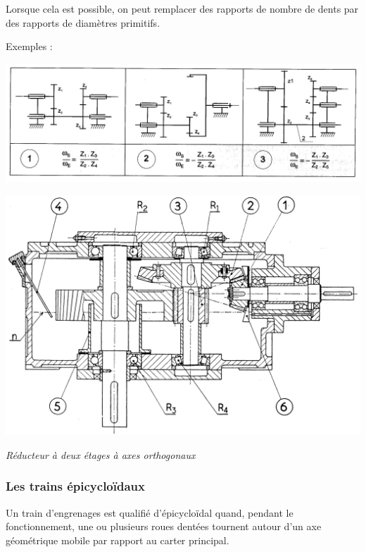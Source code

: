 \documentclass[11pt,oneside]{article}
\begin{document}
Lorsque cela est possible, on peut remplacer des rapports de nombre de dents par des rapports de diamètres primitifs.

Exemples : 

\begin{center}
\includegraphics[width=.8\textwidth]{png/fig_82}
\end{center}


\begin{center}
\includegraphics[width=.8\textwidth]{png/fig_83}

\textit{Réducteur à deux étages à axes orthogonaux}
\end{center}


\subsubsection{Les trains épicycloïdaux}

Un train d'engrenages est qualifié d'épicycloïdal quand, pendant le fonctionnement, une ou plusieurs roues dentées tournent autour d'un axe géométrique mobile par rapport au carter principal.
\end{document}
